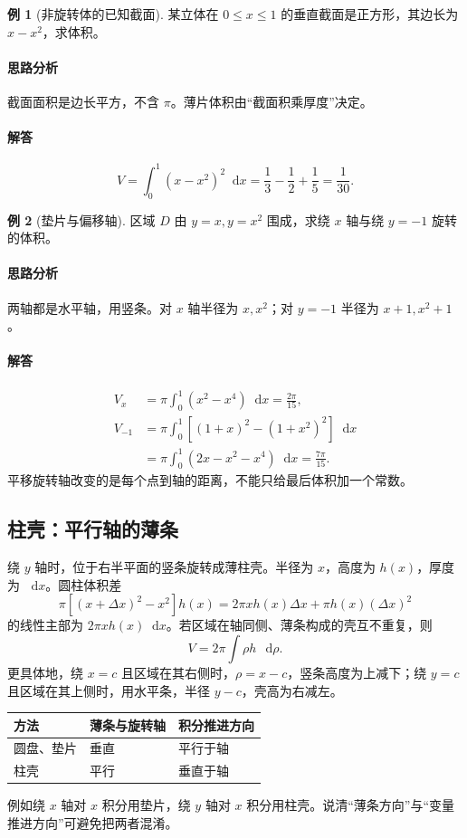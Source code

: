 \documentclass[UTF8,fontset=fandol,12pt,oneside,openany]{ctexrep}
\newcommand{\dd}{\mathop{}\!\mathrm d}
\theoremstyle{definition}
\newtheorem{example}{例}[chapter]
\begin{document}
\begin{example}[非旋转体的已知截面]
某立体在 $0\le x\le1$ 的垂直截面是正方形，其边长为 $x-x^2$，求体积。
\end{example}
\paragraph{思路分析}截面面积是边长平方，不含 $\pi$。薄片体积由“截面积乘厚度”决定。
\paragraph{解答}
\[
 V=\int_0^1(x-x^2)^2\dd x=\frac13-\frac12+\frac15=\frac1{30}.
\]

\begin{example}[垫片与偏移轴]
区域 $D$ 由 $y=x,y=x^2$ 围成，求绕 $x$ 轴与绕 $y=-1$ 旋转的体积。
\end{example}
\paragraph{思路分析}两轴都是水平轴，用竖条。对 $x$ 轴半径为 $x,x^2$；对 $y=-1$ 半径为 $x+1,x^2+1$。
\paragraph{解答}
\begin{align*}
 V_x&=\pi\int_0^1(x^2-x^4)\dd x=\frac{2\pi}{15},\\
 V_{-1}&=\pi\int_0^1[(1+x)^2-(1+x^2)^2]\dd x\\
 &=\pi\int_0^1(2x-x^2-x^4)\dd x=\frac{7\pi}{15}.
\end{align*}
平移旋转轴改变的是每个点到轴的距离，不能只给最后体积加一个常数。

\subsection{柱壳：平行轴的薄条}
绕 $y$ 轴时，位于右半平面的竖条旋转成薄柱壳。半径为 $x$，高度为 $h(x)$，厚度为 $\dd x$。圆柱体积差
\[
 \pi[(x+\Delta x)^2-x^2]h(x)
 =2\pi xh(x)\Delta x+\pi h(x)(\Delta x)^2
\]
的线性主部为 $2\pi xh(x)\dd x$。若区域在轴同侧、薄条构成的壳互不重复，则
\[
 V=2\pi\int \rho h\,\dd\rho.
\]
更具体地，绕 $x=c$ 且区域在其右侧时，$\rho=x-c$，竖条高度为上减下；绕 $y=c$ 且区域在其上侧时，用水平条，半径 $y-c$，壳高为右减左。

\begin{center}
\begin{tabular}{lll}
\toprule
方法 & 薄条与旋转轴 & 积分推进方向\\
\midrule
圆盘、垫片 & 垂直 & 平行于轴\\
柱壳 & 平行 & 垂直于轴\\
\bottomrule
\end{tabular}
\end{center}
例如绕 $x$ 轴对 $x$ 积分用垫片，绕 $y$ 轴对 $x$ 积分用柱壳。说清“薄条方向”与“变量推进方向”可避免把两者混淆。
\end{document}
